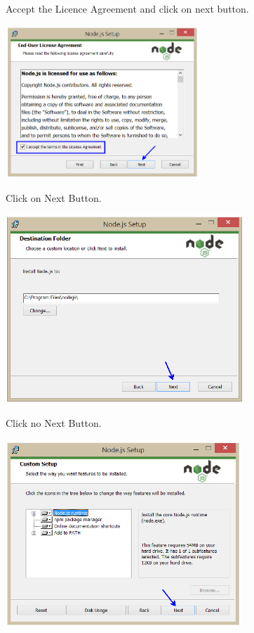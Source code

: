 \documentclass{article}
\begin{document}
\noindent 


  Accept the Licence Agreement and click on next button.


\begin{center}
	\noindent \includegraphics*[width=2.88in, height=2.26in]{IMG-06-09}
\end{center}

 
   Click on Next Button.
 

\begin{center}
	\noindent \includegraphics*[width=3.53in, height=2.79in]{IMG-06-10}
\end{center}

\noindent 

 
   Click no Next Button.
 

\begin{center}
	\noindent \includegraphics*[width=3.48in, height=2.77in]{IMG-06-11}
\end{center}
\end{document}

